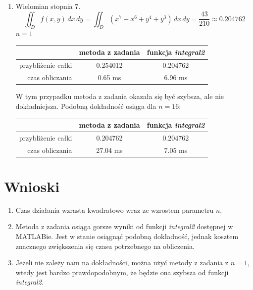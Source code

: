 \documentclass[12pt]{article}
\begin{document}
\begin{enumerate}[label=\textbf{Przykład \arabic*}]
	
	
		\item
		Wielomian stopnia 7.
		$$\iint_D f(x, y) \,dx\,dy = \iint_D (x^7 + x^6 + y^4 + y^3) \,dx\,dy = \frac{43}{210} \approx 0.204762$$
		$n = 1$
		
		\begin{table}[H]
			\centering
			\begin{tabular}{|r|c|c|}
				\hline
				                   & metoda z zadania & funkcja \textit{integral2} \\ \hline
				przybliżenie całki &     0.254012     & 0.204762                   \\ \hline
				   czas obliczania &     0.65 ms      & 6.96 ms                    \\ \hline
			\end{tabular}
		\end{table}
	
		W tym przypadku metoda z zadania okazała się być szybsza, ale nie dokładniejsza. Podobną dokładność osiąga dla $n = 16$:
		
		\begin{table}[H]
			\centering
			\begin{tabular}{|r|c|c|}
				\hline
				                   & metoda z zadania & funkcja \textit{integral2} \\ \hline
				przybliżenie całki &     0.204762     & 0.204762                   \\ \hline
				   czas obliczania &     27.04 ms     & 7.05 ms                    \\ \hline
			\end{tabular}
		\end{table}
		
	\end{enumerate}
	
	
	
	
	
	
	\section{Wnioski}
	\begin{enumerate}
		\item Czas działania wzrasta kwadratowo wraz ze wzrostem parametru $n$.
		
		\item Metoda z zadania osiąga gorsze wyniki od funkcji \textit{integral2} dostępnej w MATLABie. Jest w stanie osiągnąć podobną dokładność, jednak kosztem znacznego zwiększenia się czasu potrzebnego na obliczenia.
		
		\item Jeżeli nie zależy nam na dokładności, można użyć metody z zadania z $n = 1$, wtedy jest bardzo prawdopodobnym, że będzie ona szybsza od funkcji \textit{integral2}.
	\end{enumerate}
\end{document}
